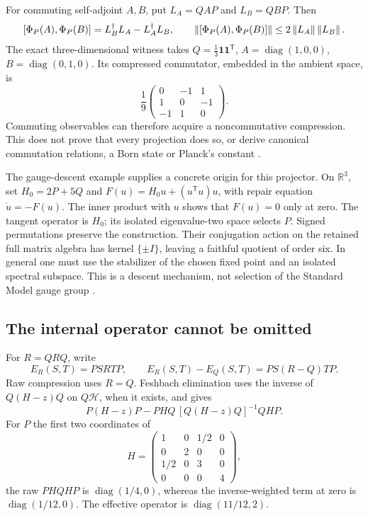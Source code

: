 \documentclass[11pt,a4paper]{article}
\begin{document}
For commuting self-adjoint \(A,B\), put \(L_A=QAP\) and \(L_B=QBP\). Then
\[
 [\Phi_P(A),\Phi_P(B)]=L_B^\dagger L_A-L_A^\dagger L_B,
 \qquad \left\lVert [\Phi_P(A),\Phi_P(B)] \right\rVert\leq2\left\lVert L_A \right\rVert\left\lVert L_B \right\rVert.
\]
The exact three-dimensional witness takes
\(Q=\frac13\mathbf1\mathbf1^{\mathsf T}\),
\(A=\operatorname{diag}(1,0,0)\), \(B=\operatorname{diag}(0,1,0)\).
Its compressed commutator, embedded in the ambient space, is
\[
 \frac19\begin{pmatrix}0&-1&1\\1&0&-1\\-1&1&0\end{pmatrix}.
\]
Commuting observables can therefore acquire a noncommutative compression.
This does not prove that every projection does so, or derive canonical
commutation relations, a Born state or Planck's constant
\cite{CBFCompression2026}.

The gauge-descent example supplies a concrete origin for this projector.
On \(\mathbb R^3\), set \(H_0=2P+5Q\) and
\(F(u)=H_0u+(u^{\mathsf T}u)u\), with repair equation \(\dot u=-F(u)\).
The inner product with \(u\) shows that \(F(u)=0\) only at zero.
The tangent operator is \(H_0\); its isolated eigenvalue-two space selects
\(P\). Signed permutations preserve the construction. Their conjugation
action on the retained full matrix algebra has kernel \(\{\pm I\}\),
leaving a faithful quotient of order six. In general one must use the
stabilizer of the chosen fixed point and an isolated spectral subspace.
This is a descent mechanism, not selection of the Standard Model gauge
group \cite{CBFGaugeDescent2026}.

\subsection{The internal operator cannot be omitted}
\label{sec:excursion-comparison}
For \(R=QRQ\), write
\[
 E_R(S,T)=PSRTP,\qquad E_R(S,T)-E_Q(S,T)=PS(R-Q)TP.
\]
Raw compression uses \(R=Q\). Feshbach elimination uses the inverse of
\(Q(H-z)Q\) on \(Q\mathcal H\), when it exists, and gives
\[
 P(H-z)P-PHQ\,[Q(H-z)Q]^{-1}QHP.
\]
For \(P\) the first two coordinates of
\[
 H=\begin{pmatrix}1&0&1/2&0\\0&2&0&0\\1/2&0&3&0\\0&0&0&4\end{pmatrix},
\]
the raw \(PHQHP\) is \(\operatorname{diag}(1/4,0)\), whereas the
inverse-weighted term at zero is \(\operatorname{diag}(1/12,0)\).
The effective operator is \(\operatorname{diag}(11/12,2)\).
\end{document}
